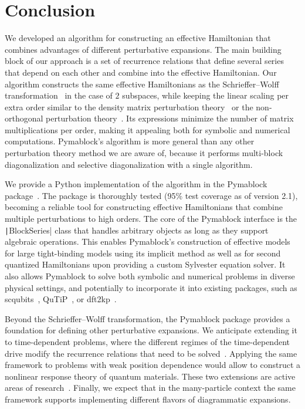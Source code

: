 \section{Conclusion}

We developed an algorithm for constructing an effective Hamiltonian that combines advantages of different perturbative expansions.
The main building block of our approach is a set of recurrence relations that define several series that depend on each other and combine into the effective Hamiltonian.
Our algorithm constructs the same effective Hamiltonians as the Schrieffer--Wolff transformation~\cite{Schrieffer_1966} in the case of $2$ subspaces, while keeping the linear scaling per extra order similar to the density matrix perturbation theory~\cite{McWeeny_1962, Truflandier_2020} or the non-orthogonal perturbation theory~\cite{Bloch_1958}.
Its expressions minimize the number of matrix multiplications per order, making it appealing both for symbolic and numerical computations.
Pymablock's algorithm is more general than any other perturbation theory method we are aware of, because it performs multi-block diagonalization and selective diagonalization with a single algorithm.

We provide a Python implementation of the algorithm in the Pymablock package~\cite{Araya_2024}.
The package is thoroughly tested (95\% test coverage as of version 2.1), becoming a reliable tool for constructing effective Hamiltonians that combine multiple perturbations to high orders.
The core of the Pymablock interface is the \texttt|BlockSeries| class that handles arbitrary objects as long as they support algebraic operations.
This enables Pymablock's construction of effective models for large tight-binding models using its implicit method as well as for second quantized Hamiltonians upon providing a custom Sylvester equation solver.
It also allows Pymablock to solve both symbolic and numerical problems in diverse physical settings, and potentially to incorporate it into existing packages, such as scqubits~\cite{Groszkowski_2021}, QuTiP~\cite{Johansson_2012,Johansson_2013}, or dft2kp~\cite{Cassiano_2024}.

Beyond the Schrieffer--Wolff transformation, the Pymablock package provides a foundation for defining other perturbative expansions.
We anticipate extending it to time-dependent problems, where the different regimes of the time-dependent drive modify the recurrence relations that need to be solved~\cite{Rodriguez-Vega_2018,Malekakhlagh_2020}.
Applying the same framework to problems with weak position dependence would allow to construct a nonlinear response theory of quantum materials.
These two extensions are active areas of research~\cite{Motzoi_2009,Bernevig_2021,Theis_2018,Venkatraman_2022,Xu_2024b, Reascos_2024}.
Finally, we expect that in the many-particle context the same framework supports implementing different flavors of diagrammatic expansions.
